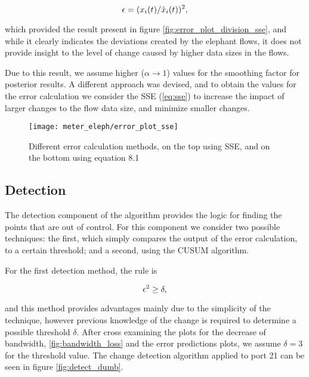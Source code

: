 \begin{equation}
    \centering
    \label{eq:division}
    \epsilon = (x_i(t)/\hat{x}_i(t))^2,
\end{equation}

\par which provided the result present in figure \ref{fig:error_plot_division_sse}, and while it clearly indicates the deviations created by the elephant flows, it 
does not provide insight to the level of change caused by higher data sizes in the flows.

Due to this result, we assume higher ($\alpha \rightarrow 1$) values for the smoothing factor for posterior results. A different approach was devised,
and to obtain the values for the error calculation we consider the SSE (\ref{eq:sse}) to increase the impact of larger changes to the flow data size,
and minimize smaller changes.

\begin{figure} [H]
    \centering
    \texttt{[image: meter\_eleph/error\_plot\_sse]}
    \caption{Different error calculation methods, on the top using SSE, and on the bottom using equation 8.1}
\end{figure}

\subsection{Detection}

The detection component of the algorithm provides the logic for finding the points that are out of control. For this component we consider two possible techniques:
the first, which simply compares the output of the error calculation, to a certain threshold; and a second, using the CUSUM algorithm. 

\par For the first detection method, the rule is 

\begin{equation*}
    \centering
    \label{eq:division}
    \epsilon^2 \geq \delta,
\end{equation*}

\par and this method provides advantages mainly due to the simplicity of the technique, however previous knowledge of the change is required to determine a possible
threshold $\delta$. After cross examining the plots for the decrease of bandwidth, \ref{fig:bandwidth_loss} and the error predictions plots, we assume $\delta = 3$
for the threshold value. The change detection algorithm applied to port 21 can be seen in figure \ref{fig:detect_dumb}.

